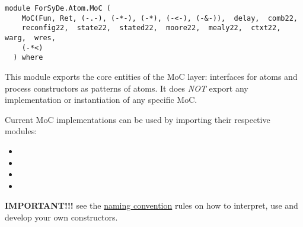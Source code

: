 \label{module:ForSyDe.Atom.MoC}
\haddockbeginheader
{\haddockverb\begin{verbatim}
module ForSyDe.Atom.MoC (
    MoC(Fun, Ret, (-.-), (-*-), (-*), (-<-), (-&-)),  delay,  comb22, 
    reconfig22,  state22,  stated22,  moore22,  mealy22,  ctxt22,  warg,  wres, 
    (-*<)
  ) where\end{verbatim}}
\haddockendheader

This module exports the core entities of the MoC layer: interfaces
 for atoms and process constructors as patterns of atoms. It does
 \emph{NOT} export any implementation or instantiation of any specific
 MoC.\par
Current MoC implementations can be used by importing their
 respective modules:\par
\begin{itemize}
\item
{}\par

\item
{}\par

\item
{}\par

\item
{}\par

\end{itemize}
\textbf{IMPORTANT!!!}
 see the \href{ForSyDe-Atom.html#naming_conv}{naming convention} rules
 on how to interpret, use and develop your own constructors.\par


